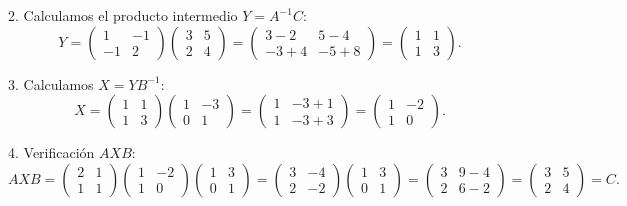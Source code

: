 \documentclass[11pt,letterpaper]{article}
\theoremstyle{definition}
\theoremstyle{plain}
\begin{document}
2. Calculamos el producto intermedio $Y = A^{-1} C$:
\[
Y = \begin{pmatrix} 1 & -1 \\ -1 & 2 \end{pmatrix} \begin{pmatrix} 3 & 5 \\ 2 & 4 \end{pmatrix} = \begin{pmatrix} 3-2 & 5-4 \\ -3+4 & -5+8 \end{pmatrix} = \begin{pmatrix} 1 & 1 \\ 1 & 3 \end{pmatrix}.
\]

3. Calculamos $X = Y B^{-1}$:
\[
X = \begin{pmatrix} 1 & 1 \\ 1 & 3 \end{pmatrix} \begin{pmatrix} 1 & -3 \\ 0 & 1 \end{pmatrix} = \begin{pmatrix} 1 & -3+1 \\ 1 & -3+3 \end{pmatrix} = \begin{pmatrix} 1 & -2 \\ 1 & 0 \end{pmatrix}.
\]

4. Verificación $A X B$:
\[
A X B = \begin{pmatrix} 2 & 1 \\ 1 & 1 \end{pmatrix} \begin{pmatrix} 1 & -2 \\ 1 & 0 \end{pmatrix} \begin{pmatrix} 1 & 3 \\ 0 & 1 \end{pmatrix} = \begin{pmatrix} 3 & -4 \\ 2 & -2 \end{pmatrix} \begin{pmatrix} 1 & 3 \\ 0 & 1 \end{pmatrix} = \begin{pmatrix} 3 & 9-4 \\ 2 & 6-2 \end{pmatrix} = \begin{pmatrix} 3 & 5 \\ 2 & 4 \end{pmatrix} = C.
\]
\end{document}
